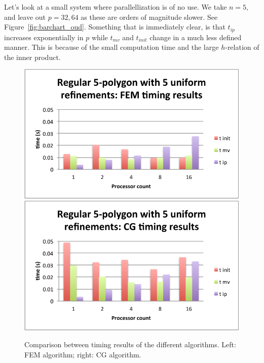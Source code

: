 \documentclass[11pt]{amsart}
\theoremstyle{definition}
\begin{document}
Let's look at a small system where parallellization is of no use. We take $n=5$, and leave out $p=32,64$ as these are orders of magnitude slower. See Figure~\ref{fig:barchart_oud}. Something that is immediately clear, is that $t_{ip}$ increases exponentially in $p$ while $t_{mv}$ and $t_{init}$ change in a much less defined manner. This is because of the small computation time and the large $h$-relation of the inner product.
\begin{figure}
  \includegraphics[width=0.48\linewidth]{barchart_oud_fem.pdf}
  \includegraphics[width=0.48\linewidth]{barchart_oud_cg.pdf}
  \caption{Comparison between timing results of the different algorithms. Left: FEM algorithm; right: CG algorithm.}
  \label{fig:times}
\end{figure}
\end{document}
